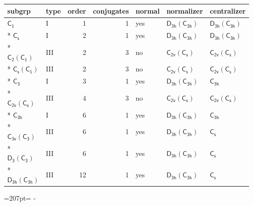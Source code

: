 \documentclass[10pt,a4paper]{article}
\newcommand{\needspace}[1]{\par\penalty-100\begingroup\dimen0=#1\relax\dimen2=\pagegoal
  \advance\dimen2-\pagetotal\ifdim\dimen0>\dimen2\relax\ifdim\dimen2>0pt\vfil\break\fi\fi
  \endgroup}
\numberwithin{equation}{section}
\newcommand{\grp}[1]{\mathsf{#1}}
\begin{document}
{\small\begin{longtable}{@{}llrrlll@{}}\toprule
subgrp & type & order & conjugates & normal & normalizer & centralizer\\\midrule\endhead
\bottomrule\endfoot\endlastfoot
\href{../../../rotation/data/pdf/C1.pdf}{$\grp{C_{1}}$} & I & 1 & 1 & yes & \href{D3h-C3h.pdf}{$\grp{D_{3h}}(\grp{C_{3h}})$} & \href{D3h-C3h.pdf}{$\grp{D_{3h}}(\grp{C_{3h}})$}\\*
\href{../../../rotation/data/pdf/C1v.pdf}{$\grp{C_{s}}$} & I & 2 & 1 & yes & \href{D3h-C3h.pdf}{$\grp{D_{3h}}(\grp{C_{3h}})$} & \href{D3h-C3h.pdf}{$\grp{D_{3h}}(\grp{C_{3h}})$}\\*
\href{C2-C1.pdf}{$\grp{C_{2}}(\grp{C_{1}})$} & III & 2 & 3 & no & \href{C2v-C1v.pdf}{$\grp{C_{2v}}(\grp{C_{s}})$} & \href{C2v-C1v.pdf}{$\grp{C_{2v}}(\grp{C_{s}})$}\\*
\href{C1v-C1.pdf}{$\grp{C_{s}}(\grp{C_{1}})$} & III & 2 & 3 & no & \href{C2v-C1v.pdf}{$\grp{C_{2v}}(\grp{C_{s}})$} & \href{C2v-C1v.pdf}{$\grp{C_{2v}}(\grp{C_{s}})$}\\*
\href{../../../rotation/data/pdf/C3.pdf}{$\grp{C_{3}}$} & I & 3 & 1 & yes & \href{D3h-C3h.pdf}{$\grp{D_{3h}}(\grp{C_{3h}})$} & \href{../../../rotation/data/pdf/C3h.pdf}{$\grp{C_{3h}}$}\\*
\href{C2v-C1v.pdf}{$\grp{C_{2v}}(\grp{C_{s}})$} & III & 4 & 3 & no & \href{C2v-C1v.pdf}{$\grp{C_{2v}}(\grp{C_{s}})$} & \href{C2v-C1v.pdf}{$\grp{C_{2v}}(\grp{C_{s}})$}\\*
\href{../../../rotation/data/pdf/C3h.pdf}{$\grp{C_{3h}}$} & I & 6 & 1 & yes & \href{D3h-C3h.pdf}{$\grp{D_{3h}}(\grp{C_{3h}})$} & \href{../../../rotation/data/pdf/C3h.pdf}{$\grp{C_{3h}}$}\\*
\href{C3v-C3.pdf}{$\grp{C_{3v}}(\grp{C_{3}})$} & III & 6 & 1 & yes & \href{D3h-C3h.pdf}{$\grp{D_{3h}}(\grp{C_{3h}})$} & \href{../../../rotation/data/pdf/C1v.pdf}{$\grp{C_{s}}$}\\*
\href{D3-C3.pdf}{$\grp{D_{3}}(\grp{C_{3}})$} & III & 6 & 1 & yes & \href{D3h-C3h.pdf}{$\grp{D_{3h}}(\grp{C_{3h}})$} & \href{../../../rotation/data/pdf/C1v.pdf}{$\grp{C_{s}}$}\\*
\href{D3h-C3h.pdf}{$\grp{D_{3h}}(\grp{C_{3h}})$} & III & 12 & 1 & yes & \href{D3h-C3h.pdf}{$\grp{D_{3h}}(\grp{C_{3h}})$} & \href{../../../rotation/data/pdf/C1v.pdf}{$\grp{C_{s}}$}\\
\bottomrule\end{longtable}}
\needspace{207pt}
\end{document}
